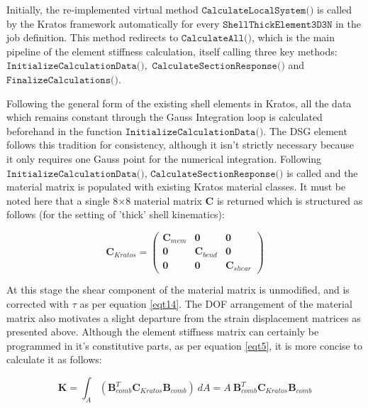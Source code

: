 Initially, the re-implemented virtual method $\texttt{CalculateLocalSystem()}$ is called by the Kratos framework automatically for every $\texttt{ShellThickElement3D3N}$ in the job definition. This method redirects to $\texttt{CalculateAll()}$, which is the main pipeline of the element stiffness calculation, itself calling three key methods: $\texttt{InitializeCalculationData()},$ \break$\texttt{CalculateSectionResponse()}$ and $\texttt{FinalizeCalculations()}$.

Following the general form of the existing shell elements in Kratos, all the data which remains constant through the Gauss Integration loop is calculated beforehand in the function $\texttt{InitializeCalculationData()}$. The DSG element follows this tradition for consistency, although it isn't strictly necessary because it only requires one Gauss point for the numerical integration. Following $\texttt{InitializeCalculationData()}$, $\texttt{CalculateSectionResponse()}$ is called and the material matrix is populated with existing Kratos material classes. It must be noted here that a single 8$\times$8 material matrix $\mathbf{C}$ is returned which is structured as follows (for the setting of 'thick' shell kinematics):

\begin{equation} 
\mathbf{C}_{Kratos} =  
\begin{pmatrix}
	\mathbf{C}_{mem} & \mathbf{0} & \mathbf{0} \\
	\mathbf{0} & \mathbf{C}_{bend} & \mathbf{0} \\
	\mathbf{0} & 	\mathbf{0} & \mathbf{C}_{shear}
\end{pmatrix}
\label{eqtCkratos}
\end{equation} 

At this stage the shear component of the material matrix is unmodified, and is corrected with $\tau$ as per equation \eqref{eqt14}. The DOF arrangement of the material matrix also motivates a slight departure from the strain displacement matrices as presented above. Although the element stiffness matrix can certainly be programmed in it's constitutive parts, as per equation \eqref{eqt5}, it is more concise to calculate it as follows:

\begin{equation} 
\mathbf{K} = \int_A  (\mathbf{B}_{comb}^T \mathbf{C}_{Kratos} \mathbf{B}_{comb} )\ dA
= A\  \mathbf{B}_{comb}^T \mathbf{C}_{Kratos} \mathbf{B}_{comb} 
\label{eqtKkratos}
\end{equation}

